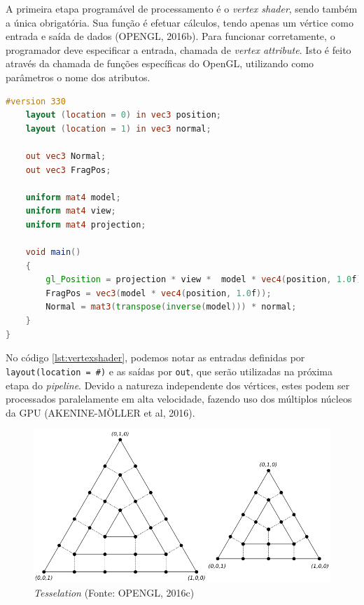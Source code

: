 A primeira etapa programável de processamento é o \textit{vertex shader}, sendo também a única obrigatória. Sua função é efetuar cálculos, tendo apenas um vértice como entrada e saída de dados (OPENGL, 2016b). Para funcionar corretamente, o programador deve especificar a entrada, chamada de \textit{vertex attribute}. Isto é feito através da chamada de funções específicas do OpenGL, utilizando como parâmetros o nome dos atributos.

\begin{lstlisting}[language=glsl,
label={lst:vertexshader},
caption="Exemplo de \textit{vertex shader}"]
	#version 330
	layout (location = 0) in vec3 position;
	layout (location = 1) in vec3 normal;
	
	out vec3 Normal;
	out vec3 FragPos;
	
	uniform mat4 model;
	uniform mat4 view;
	uniform mat4 projection;
	
	void main()
	{
		gl_Position = projection * view *  model * vec4(position, 1.0f);
		FragPos = vec3(model * vec4(position, 1.0f));
		Normal = mat3(transpose(inverse(model))) * normal;  
	} 
}
\end{lstlisting}

No código \ref{lst:vertexshader}, podemos notar as entradas definidas por \lstinline{layout(location = #)} e as saídas por \lstinline{out}, que serão utilizadas na próxima etapa do \textit{pipeline}. Devido a natureza independente dos vértices, estes podem ser processados paralelamente em alta velocidade, fazendo uso dos múltiplos núcleos da GPU (AKENINE-MÖLLER et al, 2016).

\begin{figure}[H]
	\centering
	\includegraphics[scale=0.5]{imagens/tesselation.png}
	\caption{\small \textit{Tesselation} (Fonte: OPENGL, 2016c)}
	\label{fig:tesselation}
\end{figure}

